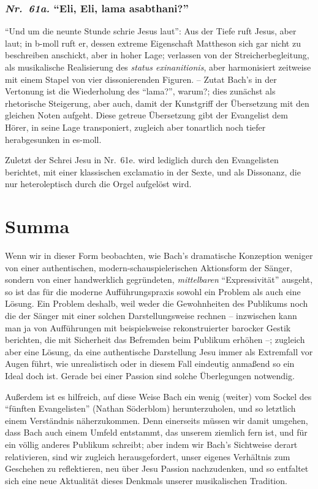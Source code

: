 \documentclass[a4paper,11pt,twoside]{scrartcl}
\newcommand{\Nr}[1]{\textmd{\textit{Nr.~#1}}}
\begin{document}
\subsubsection*{\Nr{61a.} \enquote{Eli, Eli, lama asabthani?}}
\enquote{Und um die neunte Stunde schrie Jesus laut}: Aus der Tiefe
ruft Jesus, aber laut; in b-moll ruft er, dessen extreme Eigenschaft
Mattheson sich gar nicht zu beschreiben anschickt, aber in hoher Lage;
verlassen von der Streicherbegleitung, als musikalische Realisierung
des \textit{status exinanitionis}, aber harmonisiert zeitweise mit
einem Stapel von vier dissonierenden Figuren. – Zutat Bach’s in der
Vertonung ist die Wiederholung des \enquote{lama?}, warum?; dies
zunächst als rhetorische Steigerung, aber auch, damit der Kunstgriff
der Übersetzung mit den gleichen Noten aufgeht.  Diese getreue
Übersetzung gibt der Evangelist dem Hörer, in seine Lage transponiert,
zugleich aber tonartlich noch tiefer herabgesunken in es-moll.

Zuletzt der Schrei Jesu in Nr.~61e. wird lediglich durch den Evangelisten
berichtet, mit einer klassischen exclamatio in der Sexte, und als
Dissonanz, die nur heteroleptisch durch die Orgel aufgelöst wird.

\section{Summa}

Wenn wir in dieser Form beobachten, wie Bach’s dramatische Konzeption
weniger von einer authentischen, modern-schauspielerischen Aktionsform
der Sänger, sondern von einer handwerklich gegründeten, \emph{mittelbaren}
\enquote{Expressivität} ausgeht, so ist das für die moderne Aufführungspraxis
sowohl ein Problem als auch eine Lösung.  Ein Problem deshalb, weil
weder die Gewohnheiten des Publikums noch die der Sänger mit einer
solchen Darstellungsweise rechnen – inzwischen kann man ja von
Aufführungen mit beispielsweise rekonstruierter barocker Gestik berichten,
die mit Sicherheit das Befremden beim Publikum erhöhen –; zugleich aber
eine Lösung, da eine authentische Darstellung Jesu immer als Extremfall
vor Augen führt, wie unrealistisch oder in diesem Fall eindeutig anmaßend
so ein Ideal doch ist.  Gerade bei einer Passion sind solche Überlegungen
notwendig.

Außerdem ist es hilfreich, auf diese Weise Bach ein wenig (weiter)
vom Sockel des \enquote{fünften Evangelisten} (Nathan
Söderblom\cite[S.~226]{thunberg}) herunterzuholen, und so letztlich einem
Verständnis näherzukommen.  Denn einerseits müssen wir damit umgehen,
dass Bach auch einem Umfeld entstammt, das unserem ziemlich fern ist,
und für ein völlig anderes Publikum schreibt; aber indem wir Bach’s
Sichtweise derart relativieren, sind wir zugleich herausgefordert, unser
eigenes Verhältnis zum Geschehen zu reflektieren, neu über Jesu Passion
nachzudenken, und so entfaltet sich eine neue Aktualität dieses Denkmals
unserer musikalischen Tradition.

\printbibliography
\end{document}
